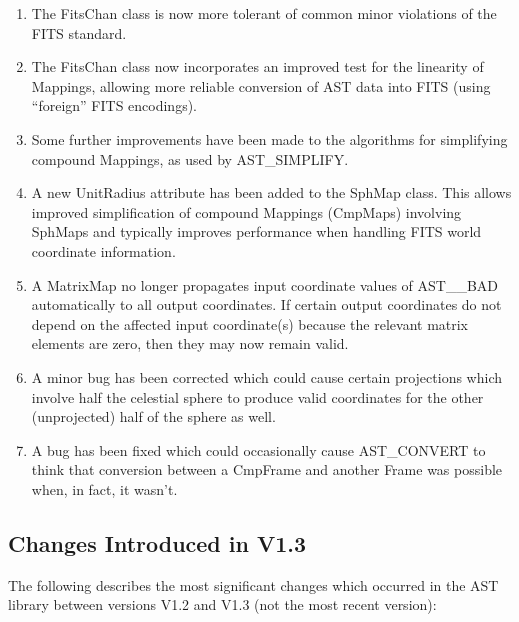 \documentclass[twoside,11pt]{article}
\newcommand{\htmlref}[2]{#1}
\begin{document}
\begin{enumerate}
\item The FitsChan class is now more tolerant of common minor
violations of the FITS standard.

\item The FitsChan class now incorporates an improved test for the
linearity of Mappings, allowing more reliable conversion of AST data
into FITS (using ``foreign'' FITS encodings).

\item Some further improvements have been made to the algorithms for
simplifying compound Mappings, as used by \htmlref{AST\_SIMPLIFY}{AST_SIMPLIFY}.

\item A new \htmlref{UnitRadius}{UnitRadius} attribute has been added to the \htmlref{SphMap}{SphMap}
class. This allows improved simplification of compound Mappings
(CmpMaps) involving SphMaps and typically improves performance when
handling FITS world coordinate information.

\item A \htmlref{MatrixMap}{MatrixMap} no longer propagates input coordinate values of
AST\_\_BAD automatically to all output coordinates. If certain output
coordinates do not depend on the affected input coordinate(s) because
the relevant matrix elements are zero, then they may now remain valid.

\item A minor bug has been corrected which could cause certain
projections which involve half the celestial sphere to produce valid
coordinates for the other (unprojected) half of the sphere as well.

\item A bug has been fixed which could occasionally cause \htmlref{AST\_CONVERT}{AST_CONVERT}
to think that conversion between a \htmlref{CmpFrame}{CmpFrame} and another Frame was
possible when, in fact, it wasn't.
\end{enumerate}

\subsection{Changes Introduced in V1.3}

The following describes the most significant changes which occurred in
the AST library between versions V1.2 and V1.3 (not the most recent
version):
\end{document}
